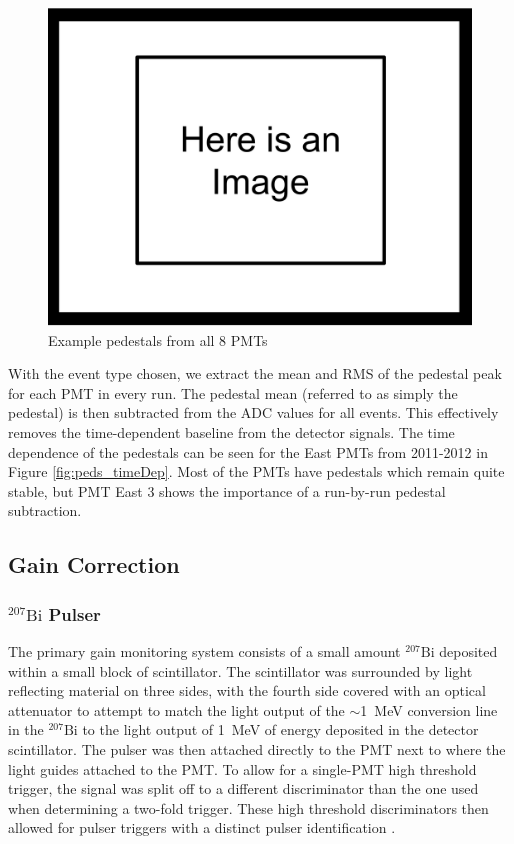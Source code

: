 \begin{figure}[h] 
\centering
\includegraphics[scale=.25]{3-UCNAAnalysis/ImageHolder.pdf}
\caption{Example pedestals from all 8 PMTs}
\label{fig:peds_ind}
\end{figure}
\fi



With the event type chosen, we extract the mean and RMS of the pedestal peak
for each PMT in every run. The pedestal mean (referred to as simply
the pedestal) is then subtracted from the ADC values for all events. This effectively
removes the time-dependent baseline from the detector signals. The time dependence of
the pedestals can be seen for the East PMTs from 2011-2012 in Figure \ref{fig:peds_timeDep}.
Most of the PMTs have pedestals which remain quite stable, but PMT East 3 shows the
importance of a run-by-run pedestal subtraction.



\subsection{Gain Correction} \label{ssec:BiGain}

\subsubsection{$^{207}\mathrm{Bi}$ Pulser}
The primary gain monitoring system consists of a small amount $^{207}\mathrm{Bi}$
deposited within a small block of scintillator. The scintillator was surrounded by
light reflecting material on three sides, with the fourth side covered with an optical
attenuator to attempt to match the light output of the $\sim$1~MeV conversion line in the $^{207}\mathrm{Bi}$
to the light output of 1~MeV of energy deposited in the detector scintillator. The pulser was then
attached directly to the PMT next to where the light guides attached to the PMT.
To allow for a single-PMT high threshold trigger, the signal was split off to a different
discriminator than the one used when determining a two-fold trigger. These high threshold
discriminators then allowed for pulser triggers with a distinct pulser identification \cite{mpmThesis}.

